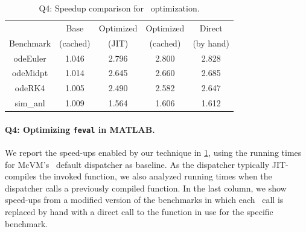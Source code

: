 \begin{description}
\begin{table}[ht!]
\begin{small}
\ifdefined \noauthorea
    \begin{adjustbox}{width=1\columnwidth}
\fi
    \begin{tabular}{ |c|c|c|c|c| }
        \cline{2-5}
        \multicolumn{1}{c|}{} & Base & Optimized & Optimized & Direct \\ 
        \cline{1-1}
        Benchmark & (cached) & (JIT) & (cached) & (by hand) \\
        \hline
        \hline
        odeEuler & 1.046 & 2.796 & 2.800 & 2.828 \\ 
        \hline
        odeMidpt & 1.014 & 2.645 & 2.660 & 2.685 \\ 
        \hline
        odeRK4 & 1.005 & 2.490 & 2.582 & 2.647 \\ 
        \hline
        sim\_anl & 1.009 & 1.564 & 1.606 & 1.612 \\ 
        \hline
    \end{tabular} 
\ifdefined \noauthorea
    \end{adjustbox}
\fi
    \caption{\label{tab:feval} Q4: Speedup comparison for \feval\ optimization.} 
\end{small}
\end{table}
\ifauthorea{\newline}{}

\paragraph{Q4: Optimizing {\tt feval} in MATLAB.}
We report the speed-ups enabled by our technique in \mytable\ref{tab:feval}, using the running times for McVM's \feval\ default dispatcher as baseline. As the dispatcher typically JIT-compiles the invoked function, we also analyzed running times when the dispatcher calls a previously compiled function. In the last column, we show speed-ups from a modified version of the benchmarks in which each \feval\ call is replaced by hand with a direct call to the function in use for the specific benchmark.


\end{description}
